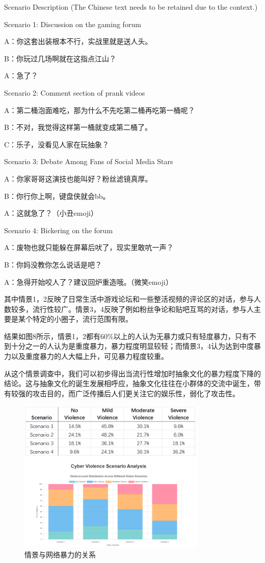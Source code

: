 \documentclass[12pt,a4paper]{ctexart}
\begin{document}
Scenario Description (The Chinese text needs to be retained due to the context.)

Scenario 1: Discussion on the gaming forum

A：你这套出装根本不行，实战里就是送人头。

B：你玩过几场啊就在这指点江山？

A：急了？

Scenario 2: Comment section of prank videos

A：第二桶泡面难吃，那为什么不先吃第二桶再吃第一桶呢？

B：不对，我觉得这样第一桶就变成第二桶了。

C：乐子，没看见人家在玩抽象？

Scenario 3: Debate Among Fans of Social Media Stars

A：你家哥哥这演技也能叫好？粉丝滤镜真厚。

B：你行你上啊，键盘侠就会bb。

A：这就急了？（小丑emoji）

Scenario 4: Bickering on the forum

A：废物也就只能躲在屏幕后吠了，现实里敢吭一声？

B：你妈没教你怎么说话是吧？

A：急得开始咬人了？建议回炉重造哦。（微笑emoji）

其中情景1，2反映了日常生活中游戏论坛和一些整活视频的评论区的对话，参与人数较多，流行性较广。情景3，4反映了例如粉丝争论和贴吧互骂的对话，参与人主要是某个特定的小圈子，流行范围有限。 

结果如图8所示，情景1，2都有60\%以上的人认为无暴力或只有轻度暴力，只有不到十分之一的人认为是重度暴力，暴力程度明显较轻；而情景3，4认为达到中度暴力以及重度暴力的人大幅上升，可见暴力程度较重。

从这个情景调查中，我们可以初步得出当流行性增加时抽象文化的暴力程度下降的结论。这与抽象文化的诞生发展相呼应，抽象文化往往在小群体的交流中诞生，带有较强的攻击目的，而广泛传播后人们更关注它的娱乐性，弱化了攻击性。

\begin{figure}[htbp]
    \centering
    \includegraphics[width=0.8\textwidth]{img/scenario_vs_net_violence.png}
    \caption{情景与网络暴力的关系}
    \label{fig:scenario_vs_net_violence}
\end{figure}
\end{document}
